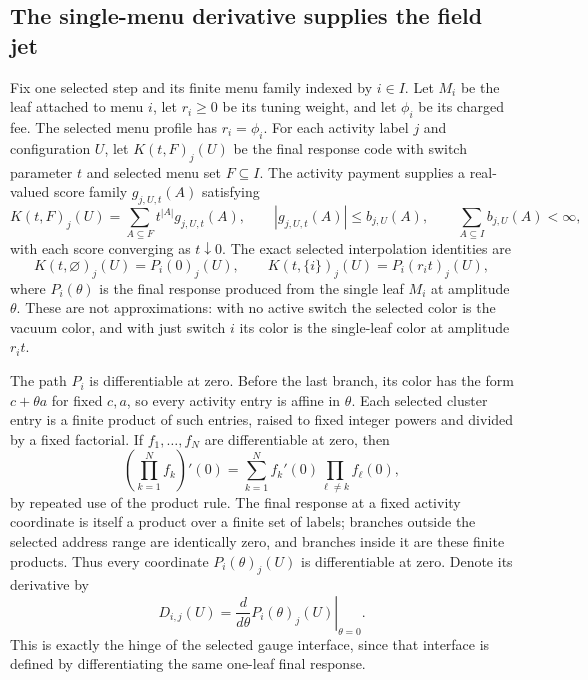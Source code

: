 \subsection{The single-menu derivative supplies the field jet}
\label{sec:ex-lattice-menu-jets}
\label{subsec:ex-lattice-menu-jet-proof}

Fix one selected step and its finite menu family indexed by $i\in I$. Let
$M_i$ be the leaf attached to menu $i$, let $r_i\geq0$ be its tuning weight,
and let $\phi_i$ be its charged fee. The selected menu profile has
$r_i=\phi_i$. For each activity label $j$ and configuration $U$, let
$K(t,F)_j(U)$ be the final response code with switch parameter $t$ and
selected menu set $F\subseteq I$. The activity payment supplies a real-valued score
family $g_{j,U,t}(A)$ satisfying
\begin{equation}
 K(t,F)_j(U)=\sum_{A\subseteq F}t^{|A|}g_{j,U,t}(A),\qquad
 |g_{j,U,t}(A)|\leq b_{j,U}(A),\qquad
 \sum_{A\subseteq I}b_{j,U}(A)<\infty,
 \label{eq:ex-lattice-menu-score}
\end{equation}
with each score converging as $t\downarrow0$. The exact selected
interpolation identities are
\begin{equation}
 K(t,\varnothing)_j(U)=P_i(0)_j(U),\qquad
 K(t,\{i\})_j(U)=P_i(r_i t)_j(U),
 \label{eq:ex-lattice-menu-singleton-path}
\end{equation}
where $P_i(\theta)$ is the final response produced from the single leaf
$M_i$ at amplitude $\theta$. These are not approximations: with no active
switch the selected color is the vacuum color, and with just switch $i$ its
color is the single-leaf color at amplitude $r_i t$.

The path $P_i$ is differentiable at zero. Before the last branch, its
color has the form $c+\theta a$ for fixed $c,a$, so every activity entry
is affine in $\theta$. Each selected cluster entry is a finite product
of such entries, raised to fixed integer powers and divided by a fixed
factorial. If $f_1,\ldots,f_N$ are differentiable at zero, then
\[
 \left(\prod_{k=1}^N f_k\right)'(0)
   =\sum_{k=1}^N f_k'(0)\prod_{\ell\ne k}f_\ell(0),
\]
by repeated use of the product rule. The final response at a fixed activity
coordinate is itself a product over a finite set of labels; branches outside
the selected address range are identically zero, and branches inside it are
these finite products. Thus every coordinate $P_i(\theta)_j(U)$ is
differentiable at zero. Denote its derivative by
\[
 D_{i,j}(U)=\left.\frac{d}{d\theta}P_i(\theta)_j(U)\right|_{\theta=0}.
\]
This is exactly the hinge of the selected gauge interface, since that interface is
defined by differentiating the same one-leaf final response.

